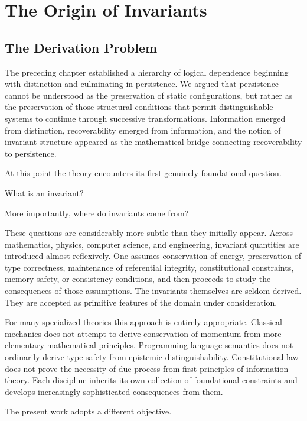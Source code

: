\documentclass[11pt]{book}
\numberwithin{equation}{chapter}
\theoremstyle{definition}
\theoremstyle{plain}
\begin{document}
\chapter{The Origin of Invariants}

\section{The Derivation Problem}

The preceding chapter established a hierarchy of logical dependence beginning with distinction and culminating in persistence. We argued that persistence cannot be understood as the preservation of static configurations, but rather as the preservation of those structural conditions that permit distinguishable systems to continue through successive transformations. Information emerged from distinction, recoverability emerged from information, and the notion of invariant structure appeared as the mathematical bridge connecting recoverability to persistence.

At this point the theory encounters its first genuinely foundational question.

What is an invariant?

More importantly, where do invariants come from?

These questions are considerably more subtle than they initially appear. Across mathematics, physics, computer science, and engineering, invariant quantities are introduced almost reflexively. One assumes conservation of energy, preservation of type correctness, maintenance of referential integrity, constitutional constraints, memory safety, or consistency conditions, and then proceeds to study the consequences of those assumptions. The invariants themselves are seldom derived. They are accepted as primitive features of the domain under consideration.

For many specialized theories this approach is entirely appropriate. Classical mechanics does not attempt to derive conservation of momentum from more elementary mathematical principles. Programming language semantics does not ordinarily derive type safety from epistemic distinguishability. Constitutional law does not prove the necessity of due process from first principles of information theory. Each discipline inherits its own collection of foundational constraints and develops increasingly sophisticated consequences from them.

The present work adopts a different objective.
\end{document}
